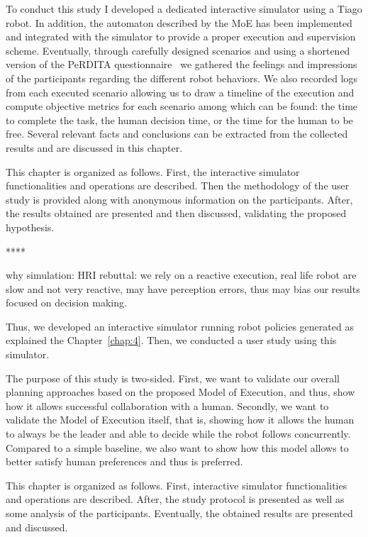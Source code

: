 To conduct this study I developed a dedicated interactive simulator using a Tiago robot. In addition, the automaton described by the MoE has been implemented and integrated with the simulator to provide a proper execution and supervision scheme. Eventually, through carefully designed scenarios and using a shortened version of the PeRDITA questionnaire~\cite{devin_evaluating_2018} we gathered the feelings and impressions of the participants regarding the different robot behaviors. We also recorded logs from each executed scenario allowing us to draw a timeline of the execution and compute objective metrics for each scenario among which can be found: the time to complete the task, the human decision time, or the time for the human to be free. Several relevant facts and conclusions can be extracted from the collected results and are discussed in this chapter.

This chapter is organized as follows. First, the interactive simulator functionalities and operations are described. Then the methodology of the user study is provided along with anonymous information on the participants. After, the results obtained are presented and then discussed, validating the proposed hypothesis.

****

why simulation: HRI rebuttal: we rely on a reactive execution, real life robot are slow and not very reactive, may have perception errors, thus may bias our results focused on decision making.

Thus, we developed an interactive simulator running robot policies generated as explained the Chapter~\ref{chap:4}. Then, we conducted a user study using this simulator.

The purpose of this study is two-sided. First, we want to validate our overall planning approaches based on the proposed Model of Execution, and thus, show how it allows successful collaboration with a human. Secondly, we want to validate the Model of Execution itself, that is, showing how it allows the human to always be the leader and able to decide while the robot follows concurrently. Compared to a simple baseline, we also want to show how this model allows to better satisfy human preferences and thus is preferred. 

This chapter is organized as follows. First, interactive simulator functionalities and operations are described. After, the study protocol is presented as well as some analysis of the participants. Eventually, the obtained results are presented and discussed.

